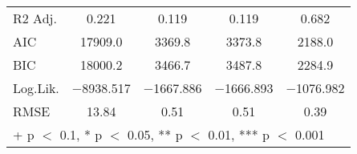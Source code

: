 \documentclass[12pt,english]{article}
\begin{document}
\begin{table}
{\begin{tabular}[t]{lcccc}
R2 Adj. & \num{0.221} & \num{0.119} & \num{0.119} & \num{0.682}\\
AIC & \num{17909.0} & \num{3369.8} & \num{3373.8} & \num{2188.0}\\
BIC & \num{18000.2} & \num{3466.7} & \num{3487.8} & \num{2284.9}\\
Log.Lik. & \num{-8938.517} & \num{-1667.886} & \num{-1666.893} & \num{-1076.982}\\
RMSE & \num{13.84} & \num{0.51} & \num{0.51} & \num{0.39}\\
\bottomrule
\multicolumn{5}{l}{\rule{0pt}{1em}+ p $<$ 0.1, * p $<$ 0.05, ** p $<$ 0.01, *** p $<$ 0.001}\\
\end{tabular}
}
\end{table}
\end{document}
